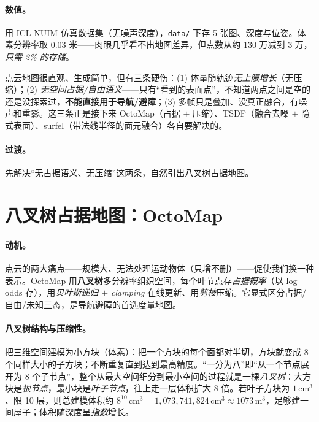 \paragraph{数值。}
用 ICL-NUIM 仿真数据集（无噪声深度），\texttt{data/} 下存 5 张图、深度与位姿。体素分辨率取 0.03 米——肉眼几乎看不出地图差异，但点数从约 130 万减到 3 万，\emph{只需 2\% 的存储}\cite{gaoxiang2019slam14}。

\begin{pitfall}
点云地图很直观、生成简单，但有三条硬伤：(1) 体量随轨迹\emph{无上限增长}（无压缩）；(2) \emph{无空间占据/自由语义}——只有“看到的表面点”，不知道两点之间是空的还是没探索过，\textbf{不能直接用于导航/避障}；(3) 多帧只是叠加、没真正融合，有噪声和重影。这三条正是接下来 OctoMap（占据 $+$ 压缩）、TSDF（融合去噪 $+$ 隐式表面）、surfel（带法线半径的面元融合）各自要解决的。
\end{pitfall}

\paragraph{过渡。}
先解决“无占据语义、无压缩”这两条，自然引出八叉树占据地图。

\section{八叉树占据地图：OctoMap}
\label{sec:dense-octomap}

\paragraph{动机。}
点云的两大痛点——规模大、无法处理运动物体（只增不删）——促使我们换一种表示\cite{gaoxiang2019slam14}。OctoMap\cite{hornung2013octomap} 用\textbf{八叉树}多分辨率组织空间，每个叶节点存\emph{占据概率}（以 log-odds 存），用\emph{贝叶斯递归 $+$ clamping} 在线更新、用\emph{剪枝}压缩。它显式区分占据/自由/未知三态，是导航避障的首选度量地图。

\paragraph{八叉树结构与压缩性。}
把三维空间建模为小方块（体素）：把一个方块的每个面都对半切，方块就变成 8 个同样大小的子方块；不断重复直到达到最高精度。“一分为八”即“从一个节点展开为 8 个子节点”，整个从最大空间细分到最小空间的过程就是一棵\emph{八叉树}：大方块是\emph{根节点}，最小块是\emph{叶子节点}，往上走一层体积扩大 8 倍。若叶子方块为 $1\,\mathrm{cm}^3$、限 10 层，则总建模体积约 $8^{10}\,\mathrm{cm}^3 = 1{,}073{,}741{,}824\,\mathrm{cm}^3\approx 1073\,\mathrm{m}^3$，足够建一间屋子；体积随深度呈\emph{指数}增长。

